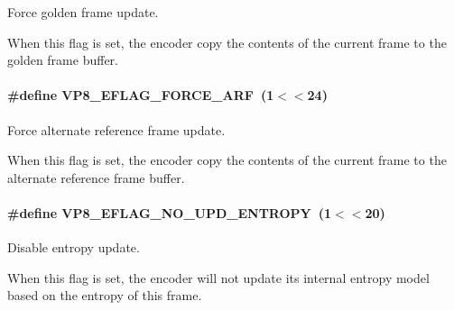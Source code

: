 \-Force golden frame update. 

\-When this flag is set, the encoder copy the contents of the current frame to the golden frame buffer. \hypertarget{group__vp8__encoder_ga50584fe4bdb62ff935347576539650b7}{
\paragraph[{\-V\-P8\-\_\-\-E\-F\-L\-A\-G\-\_\-\-F\-O\-R\-C\-E\-\_\-\-A\-R\-F}]{\setlength{\rightskip}{0pt plus 5cm}\#define \-V\-P8\-\_\-\-E\-F\-L\-A\-G\-\_\-\-F\-O\-R\-C\-E\-\_\-\-A\-R\-F~(1$<$$<$24)}}
\label{group__vp8__encoder_ga50584fe4bdb62ff935347576539650b7}


\-Force alternate reference frame update. 

\-When this flag is set, the encoder copy the contents of the current frame to the alternate reference frame buffer. \hypertarget{group__vp8__encoder_ga5b91ad179910d4efc23aef66c7b2148b}{
\paragraph[{\-V\-P8\-\_\-\-E\-F\-L\-A\-G\-\_\-\-N\-O\-\_\-\-U\-P\-D\-\_\-\-E\-N\-T\-R\-O\-P\-Y}]{\setlength{\rightskip}{0pt plus 5cm}\#define \-V\-P8\-\_\-\-E\-F\-L\-A\-G\-\_\-\-N\-O\-\_\-\-U\-P\-D\-\_\-\-E\-N\-T\-R\-O\-P\-Y~(1$<$$<$20)}}
\label{group__vp8__encoder_ga5b91ad179910d4efc23aef66c7b2148b}


\-Disable entropy update. 

\-When this flag is set, the encoder will not update its internal entropy model based on the entropy of this frame. 

